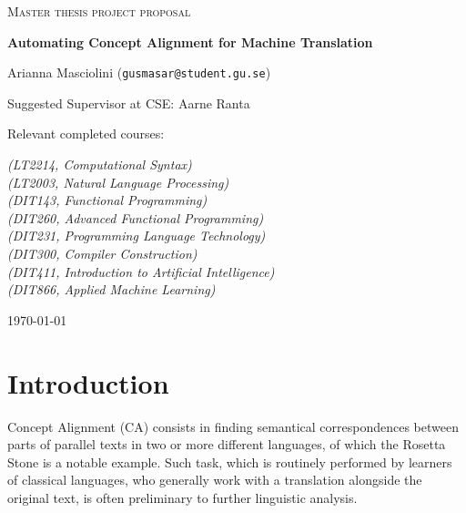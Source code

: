 \documentclass{article}
\begin{document}
\begin{titlepage}
  

\centering
  
  
{\scshape\LARGE Master thesis project proposal\\}
  
\vspace{0.5cm}
  
{\huge\bfseries Automating Concept Alignment for Machine Translation\\}

\vspace{2cm}
  
{\Large Arianna Masciolini (\texttt{gusmasar@student.gu.se})\\}

\vspace{0.2cm}
  
{\large Suggested Supervisor at CSE: Aarne Ranta\\}
  
\vspace{1.5cm}
  
{\large Relevant completed courses:\par}
  
{\itshape (LT2214, Computational Syntax)\\}
{\itshape (LT2003, Natural Language Processing)\\}
{\itshape (DIT143, Functional Programming)\\}
{\itshape (DIT260, Advanced Functional Programming)\\}
{\itshape (DIT231, Programming Language Technology)\\}
{\itshape (DIT300, Compiler Construction)\\}
{\itshape (DIT411, Introduction to Artificial Intelligence)\\}
{\itshape (DIT866, Applied Machine Learning)\\}
  
\vfill
\vfill
  
{\large \today\\} 


\end{titlepage}

\section{Introduction}
Concept Alignment (CA) consists in finding semantical correspondences between parts of parallel texts in two or more different languages, of which the Rosetta Stone is a notable example. 
Such task, which is routinely performed by learners of classical languages, who generally work with a translation alongside the original text, is often preliminary to further linguistic analysis.
\end{document}
